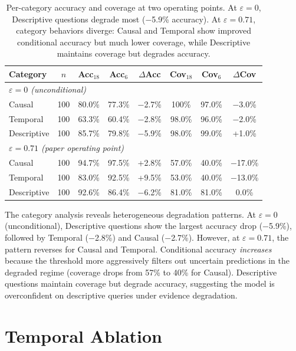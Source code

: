 \documentclass{article}
\begin{document}
\begin{table}[h]
\centering
\small
\begin{tabular}{lccccccc}
\toprule
Category & $n$ & Acc$_{18}$ & Acc$_6$ & $\Delta$Acc & Cov$_{18}$ & Cov$_6$ & $\Delta$Cov \\
\midrule
\multicolumn{8}{l}{\textit{$\varepsilon = 0$ (unconditional)}} \\
Causal & 100 & 80.0\% & 77.3\% & $-$2.7\% & 100\% & 97.0\% & $-$3.0\% \\
Temporal & 100 & 63.3\% & 60.4\% & $-$2.8\% & 98.0\% & 96.0\% & $-$2.0\% \\
Descriptive & 100 & 85.7\% & 79.8\% & $-$5.9\% & 98.0\% & 99.0\% & +1.0\% \\
\midrule
\multicolumn{8}{l}{\textit{$\varepsilon = 0.71$ (paper operating point)}} \\
Causal & 100 & 94.7\% & 97.5\% & +2.8\% & 57.0\% & 40.0\% & $-$17.0\% \\
Temporal & 100 & 83.0\% & 92.5\% & +9.5\% & 53.0\% & 40.0\% & $-$13.0\% \\
Descriptive & 100 & 92.6\% & 86.4\% & $-$6.2\% & 81.0\% & 81.0\% & 0.0\% \\
\bottomrule
\end{tabular}
\caption{Per-category accuracy and coverage at two operating points. At $\varepsilon=0$, Descriptive questions degrade most ($-$5.9\% accuracy). At $\varepsilon=0.71$, category behaviors diverge: Causal and Temporal show improved conditional accuracy but much lower coverage, while Descriptive maintains coverage but degrades accuracy.}
\label{tab:category}
\end{table}

The category analysis reveals heterogeneous degradation patterns. At $\varepsilon=0$ (unconditional), Descriptive questions show the largest accuracy drop ($-$5.9\%), followed by Temporal ($-$2.8\%) and Causal ($-$2.7\%). However, at $\varepsilon=0.71$, the pattern reverses for Causal and Temporal. Conditional accuracy \emph{increases} because the threshold more aggressively filters out uncertain predictions in the degraded regime (coverage drops from 57\% to 40\% for Causal). Descriptive questions maintain coverage but degrade accuracy, suggesting the model is overconfident on descriptive queries under evidence degradation.

\section{Temporal Ablation}
\label{app:halfclip}
\end{document}
